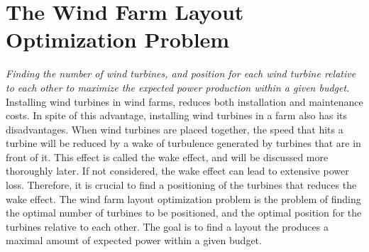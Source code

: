\documentclass{article}
\begin{document}
\section{The Wind Farm Layout Optimization Problem}


\textit{Finding the number of wind turbines, and position for each wind turbine relative to each other to maximize the expected power production within a given budget.}\\


\noindent Installing wind turbines in wind farms, reduces both installation and maintenance costs. In spite of this advantage, installing wind turbines in a farm also has its disadvantages. When wind turbines are placed together, the speed that hits a turbine will be reduced by a wake of turbulence generated by turbines that are in front of it. This effect is called the wake effect, and will be discussed more thoroughly later. If not considered, the wake effect can lead to extensive power loss. Therefore, it is crucial to find a positioning of the turbines that reduces the wake effect. The wind farm layout optimization problem is the problem of finding the optimal number of turbines to be positioned, and the optimal position for the turbines relative to each other. The goal is to find a layout the produces a maximal amount of expected power within a given budget.
\end{document}
